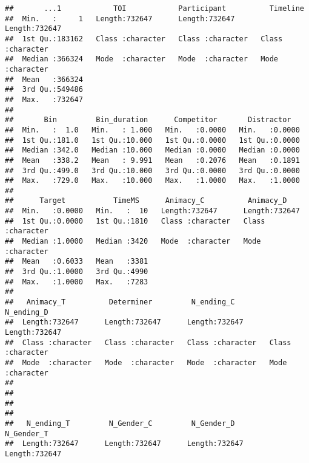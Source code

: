 \documentclass[
]{article}
\begin{document}
\begin{verbatim}
##       ...1            TOI            Participant          Timeline        
##  Min.   :     1   Length:732647      Length:732647      Length:732647     
##  1st Qu.:183162   Class :character   Class :character   Class :character  
##  Median :366324   Mode  :character   Mode  :character   Mode  :character  
##  Mean   :366324                                                           
##  3rd Qu.:549486                                                           
##  Max.   :732647                                                           
##                                                                           
##       Bin         Bin_duration      Competitor       Distractor    
##  Min.   :  1.0   Min.   : 1.000   Min.   :0.0000   Min.   :0.0000  
##  1st Qu.:181.0   1st Qu.:10.000   1st Qu.:0.0000   1st Qu.:0.0000  
##  Median :342.0   Median :10.000   Median :0.0000   Median :0.0000  
##  Mean   :338.2   Mean   : 9.991   Mean   :0.2076   Mean   :0.1891  
##  3rd Qu.:499.0   3rd Qu.:10.000   3rd Qu.:0.0000   3rd Qu.:0.0000  
##  Max.   :729.0   Max.   :10.000   Max.   :1.0000   Max.   :1.0000  
##                                                                    
##      Target           TimeMS      Animacy_C          Animacy_D        
##  Min.   :0.0000   Min.   :  10   Length:732647      Length:732647     
##  1st Qu.:0.0000   1st Qu.:1810   Class :character   Class :character  
##  Median :1.0000   Median :3420   Mode  :character   Mode  :character  
##  Mean   :0.6033   Mean   :3381                                        
##  3rd Qu.:1.0000   3rd Qu.:4990                                        
##  Max.   :1.0000   Max.   :7283                                        
##                                                                       
##   Animacy_T          Determiner         N_ending_C         N_ending_D       
##  Length:732647      Length:732647      Length:732647      Length:732647     
##  Class :character   Class :character   Class :character   Class :character  
##  Mode  :character   Mode  :character   Mode  :character   Mode  :character  
##                                                                             
##                                                                             
##                                                                             
##                                                                             
##   N_ending_T         N_Gender_C         N_Gender_D         N_Gender_T       
##  Length:732647      Length:732647      Length:732647      Length:732647     

\end{verbatim}
\end{document}
